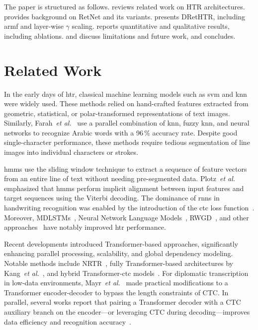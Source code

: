 \documentclass[times, review, 10pt]{elsarticle}
\begin{document}
The paper is structured as follows.  reviews related work on HTR architectures.  provides background on RetNet and its variants.  presents DRetHTR, including \ac{armf} and layer-wise $\gamma$ scaling.  reports quantitative and qualitative results, including ablations.  and  discuss limitations and future work, and  concludes.

\section{Related Work}
\label{sec:formatting}
In the early days of \ac{htr}, classical machine learning models such as \ac{svm} and \ac{knn} were widely used.
These methods relied on hand-crafted features extracted from geometric, statistical, or polar-transformed representations of text images.
Similarly, Farah~\textit{et al.}~\cite{KNN_HTR} use a parallel combination of \ac{knn}, fuzzy \ac{knn}, and neural networks to recognize Arabic words with a 96\,\% accuracy rate. Despite good single-character performance, these methods require tedious segmentation of line images into individual characters or strokes.

\acp{hmm} use the sliding window technique to extract a sequence of feature vectors from an entire line of text without needing pre-segmented data. Plotz~\textit{et al.}~\cite{HMM_HTR} emphasized that \acp{hmm} perform implicit alignment between input features and target sequences using the Viterbi decoding. The dominance of \acp{rnn} in handwriting recognition was enabled by the introduction of the \ac{ctc} loss function~\cite{CTC}. Moreover, MDLSTMs~\cite{MDLSTM,Bluche}, Neural Network Language Models~\cite{NN_LMs}, RWGD~\cite{RWGD}, and other approaches~\cite{pham2014dropout,Bluche2017} have notably improved \ac{htr} performance.

Recent developments introduced Transformer-based approaches, significantly enhancing parallel processing, scalability, and global dependency modeling. Notable methods include NRTR~\cite{NRTR}, fully Transformer-based architectures by Kang~\textit{et al.}~\cite{Kang}, and hybrid Transformer-\ac{ctc} models~\cite{Diaz2021RethinkingTL,htrvt}. For diplomatic transcription in low-data environments, Mayr~\textit{et al.}~\cite{Mayr2025DiplomaticHTR} made practical modifications to a Transformer encoder-decoder to bypass the length constraints of CTC. In parallel, several works report that pairing a Transformer decoder with a CTC auxiliary branch on the encoder—or leveraging CTC during decoding—improves data efficiency and recognition accuracy~\cite{barrere2022light,Barrere2024FewDataHTR,Wick2022CTCPrefixRescoring}.
\end{document}
